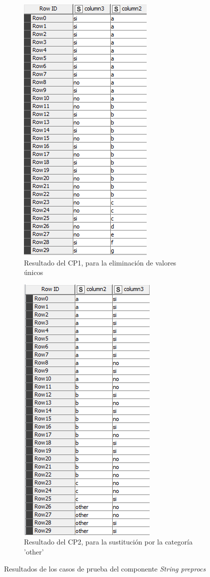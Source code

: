 \begin{figure}[H]
	\centering
	\begin{subfigure}[b]{0.45\linewidth}
		\centering
		\includegraphics[width=0.45\linewidth]{"figuras/capi 3/pruebas-jenn/resultado-cp1-string-prep"}
		\caption{Resultado del CP1, para la eliminación de valores únicos}
		\label{fig:resultado-cp1-string-prep}
	\end{subfigure}
	\hspace{0.5cm}
	\begin{subfigure}[b]{0.45\linewidth}
		\centering
		\includegraphics[width=0.45\linewidth]{"figuras/capi 3/pruebas-jenn/resultado-cp2-string-prep"}
		\caption{Resultado del CP2, para la sustitución por la categoría 'other'}
		\label{fig:resultado-cp2-string-prep}
	\end{subfigure}
	\caption{Resultados de los casos de prueba del componente \textit{String preprocs}}
	\label{fig:resultado-cp-string-preprocs}
\end{figure}


